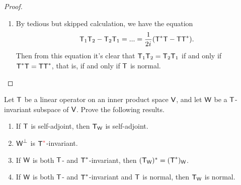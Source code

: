 \begin{proof}
\begin{enumerate}
\item By tedious but skipped calculation, we have the equation
\[
    \textsf{T}_1\textsf{T}_2 - \textsf{T}_2\textsf{T}_1 = ... = \frac{1}{2{i\mkern1mu}} (\textsf{T}^*\textsf{T} - \textsf{T}\textsf{T}^*).
\]
Then from this equation it's clear that \(\textsf{T}_1\textsf{T}_2 = \textsf{T}_2\textsf{T}_1\) if and only if \(\textsf{T}^*\textsf{T} = \textsf{T}\textsf{T}^*\), that is, if and only if \(\textsf{T}\) is normal.
\end{enumerate}
\end{proof}

\begin{exercise} \label{exercise 6.4.7}
Let \(\textsf{T}\) be a linear operator on an inner product space \(\textsf{V}\), and let \(\textsf{W}\) be a \(\textsf{T}\)-invariant subspace of \(\textsf{V}\).
Prove the following results.
\begin{enumerate}
\item If \(\textsf{T}\) is self-adjoint, then \(\textsf{T}_{\textsf{W}}\) is self-adjoint.
\item \(\textsf{W}^{\perp}\) is \(\T^{\RED{*}}\)-invariant.
\item If \(\textsf{W}\) is both \(\textsf{T}\)- and \(\textsf{T}^*\)-invariant, then \((\textsf{T}_{\textsf{W}})^* = (\textsf{T}^*)_{\textsf{W}}\).
\item If \(\textsf{W}\) is both \(\textsf{T}\)- and \(\textsf{T}^*\)-invariant and \(\textsf{T}\) is normal, then \(\textsf{T}_{\textsf{W}}\) is normal.
\end{enumerate}
\end{exercise}

